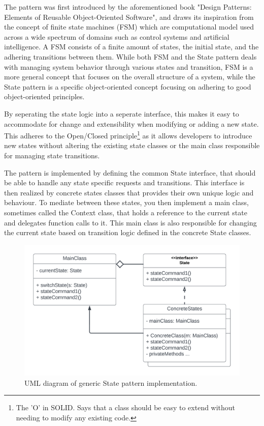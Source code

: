     The pattern was first introduced by the aforementioned book "Design Patterns: Elements of Reusable Object-Oriented Software", and draws its inspiration from the concept of finite state machines (FSM) which are computational model used across a wide spectrum of domains such as control systems and artificial intelligence. A FSM consists of a finite amount of states, the initial state, and the adhering transitions between them. While both FSM and the State pattern deals with managing system behavior through various states and transition, FSM is a more general concept that focuses on the overall structure of a system, while the State pattern is a specific object-oriented concept focusing on adhering to good object-oriented principles.

    By seperating the state logic into a seperate interface, this makes it easy to accommodate for change and extensibility when modifying or adding a new state. This adheres to the Open/Closed principle\footnote{The 'O' in SOLID. Says that a class should be easy to extend without needing to modify any existing code.} as it allows developers to introduce new states without altering the existing state classes or the main class responsible for managing state transitions.

    The pattern is implemented by defining the common State interface, that should be able to handle any state specific requests and transitions. This interface is then realized by concrete states classes that provides their own unique logic and behaviour. To mediate between these states, you then implement a main class, sometimes called the Context class, that holds a reference to the current state and delegates function calls to it. This main class is also responsible for changing the current state based on transition logic defined in the concrete State classes.
    
    \begin{figure}[H]
      \centering
      \includegraphics[scale=0.75]{Project_report/figures/theory/design_patterns/state_uml.png}
      \caption{UML diagram of generic State pattern implementation.}
      \label{fig:observer_uml}
    \end{figure}